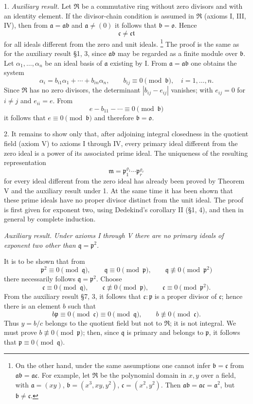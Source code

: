 \documentclass[11pt]{article}
\providecommand{\mR}{\mathfrak{R}}
\providecommand{\ma}{\mathfrak{a}}
\providecommand{\mb}{\mathfrak{b}}
\providecommand{\mc}{\mathfrak{c}}
\providecommand{\mm}{\mathfrak{m}}
\providecommand{\mo}{\mathfrak{o}}
\providecommand{\mpideal}{\mathfrak{p}}
\providecommand{\mq}{\mathfrak{q}}
\providecommand{\mt}{\mathfrak{t}}
\begin{document}
1. \emph{Auxiliary result.} Let $\mR$ be a commutative ring without zero divisors and with an identity element. If the divisor-chain condition is assumed in $\mR$ (axioms I, III, IV), then from $\ma=\ma\mb$ and $\ma\ne(0)$ it follows that $\mb=\mo$. Hence
\[
        \mc\ne\mc\mt
\]
for all ideals different from the zero and unit ideals.
\footnote{On the other hand, under the same assumptions one cannot infer $\mb=\mc$ from $\ma\mb=\ma\mc$. For example, let $\mR$ be the polynomial domain in $x,y$ over a field, with $\ma=(xy)$, $\mb=(x^3,xy,y^2)$, $\mc=(x^2,y^2)$. Then $\ma\mb=\ma\mc=\ma^2$, but $\mb\ne\mc$.}
The proof is the same as for the auxiliary result §1, 3, since $\ma\mb$ may be regarded as a finite module over $\mb$. Let $\alpha_1,\ldots,\alpha_n$ be an ideal basis of $\ma$ existing by I. From $\ma=\ma\mb$ one obtains the system
\[
        \alpha_i=b_{i1}\alpha_1+\cdots+b_{in}\alpha_n,
        \qquad b_{ij}\equiv0\pmod{\mb},\quad i=1,\ldots,n .
\]
Since $\mR$ has no zero divisors, the determinant $|b_{ij}-e_{ij}|$ vanishes; with $e_{ij}=0$ for $i\ne j$ and $e_{ii}=e$. From
\[
        e-b_{11}-\cdots\equiv0\pmod{\mb}
\]
it follows that $e\equiv0\pmod{\mb}$ and therefore $\mb=\mo$.

2. It remains to show only that, after adjoining integral closedness in the quotient field (axiom V) to axioms I through IV, every primary ideal different from the zero ideal is a power of its associated prime ideal. The uniqueness of the resulting representation
\[
        \mm=\mpideal_1^{\varrho_1}\cdots\mpideal_r^{\varrho_r}
\]
for every ideal different from the zero ideal has already been proved by Theorem V and the auxiliary result under 1. At the same time it has been shown that these prime ideals have no proper divisor distinct from the unit ideal. The proof is first given for exponent two, using Dedekind's corollary II (§1, 4), and then in general by complete induction.

\emph{Auxiliary result.} \emph{Under axioms I through V there are no primary ideals of exponent two other than $\mq=\mpideal^2$.}

It is to be shown that from
\[
        \mpideal^2\equiv0\pmod{\mq},
        \qquad \mq\equiv0\pmod{\mpideal},
        \qquad \mq\not\equiv0\pmod{\mpideal^2}
\]
there necessarily follows $\mq=\mpideal^2$. Choose
\[
        \mc\equiv0\pmod{\mq},
        \qquad \mc\not\equiv0\pmod{\mpideal},
        \qquad \mc\equiv0\pmod{\mpideal^2}.
\]
From the auxiliary result §7, 3, it follows that $\mc:\mpideal$ is a proper divisor of $\mc$; hence there is an element $b$ such that
\[
        b\mpideal\equiv0\pmod{\mc}\equiv0\pmod{\mq},
        \qquad b\not\equiv0\pmod{\mc}.
\]
Thus $y=b/c$ belongs to the quotient field but not to $\mR$; it is not integral. We must prove $b\not\equiv0\pmod{\mpideal}$; then, since $\mq$ is primary and belongs to $\mpideal$, it follows that $\mpideal\equiv0\pmod{\mq}$.
\end{document}
